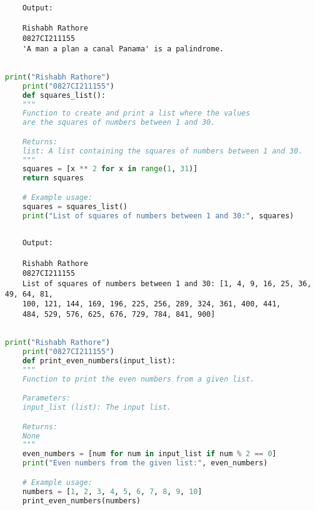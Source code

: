 \documentclass{report}
\begin{document}
\begin{verbatim}
	Output:

	Rishabh Rathore
	0827CI211155
	'A man a plan a canal Panama' is a palindrome.
	
\end{verbatim}


\newpage


\sol 
\begin{lstlisting}[language=Python]
	print("Rishabh Rathore")
	print("0827CI211155")
	def squares_list():
    """
    Function to create and print a list where the values 
	are the squares of numbers between 1 and 30.

    Returns:
    list: A list containing the squares of numbers between 1 and 30.
    """
    squares = [x ** 2 for x in range(1, 31)]
    return squares

	# Example usage:
	squares = squares_list()
	print("List of squares of numbers between 1 and 30:", squares)
  

\end{lstlisting}

\begin{verbatim}
	Output:

	Rishabh Rathore
	0827CI211155
	List of squares of numbers between 1 and 30: [1, 4, 9, 16, 25, 36, 49, 64, 81,
	100, 121, 144, 169, 196, 225, 256, 289, 324, 361, 400, 441,
	484, 529, 576, 625, 676, 729, 784, 841, 900]
	

\end{verbatim}


\newpage


\sol 
\begin{lstlisting}[language=Python]
	print("Rishabh Rathore")
	print("0827CI211155")
	def print_even_numbers(input_list):
    """
    Function to print the even numbers from a given list.

    Parameters:
    input_list (list): The input list.

    Returns:
    None
    """
    even_numbers = [num for num in input_list if num % 2 == 0]
    print("Even numbers from the given list:", even_numbers)

	# Example usage:
	numbers = [1, 2, 3, 4, 5, 6, 7, 8, 9, 10]
	print_even_numbers(numbers)
  

\end{lstlisting}
\end{document}
